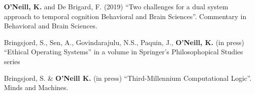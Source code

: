 \textbf{O'Neill, K.} and De Brigard, F. (2019) ``Two challenges for a
dual system approach to temporal cognition Behavioral and Brain
Sciences''. Commentary in Behavioral and Brain Sciences.

Bringsjord, S., Sen, A., Govindarajulu, N.S., Paquin, J.,
\textbf{O'Neill, K.} (in press) ``Ethical Operating Systems'' in a
volume in Springer’s Philosophopical Studies series

Bringsjord, S. \& \textbf{O'Neill K.} (in press) ``Third-Millennium
Computational Logic''. Minds and Machines.
